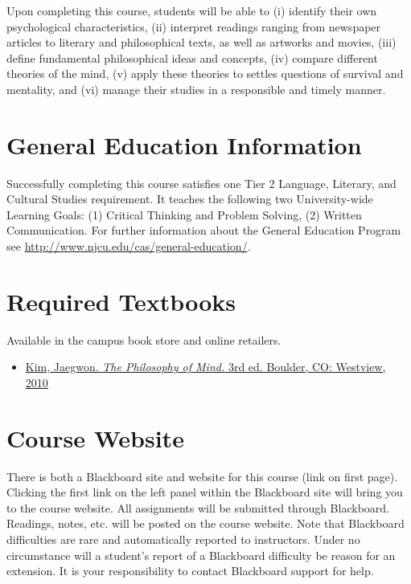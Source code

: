 \documentclass[article,oneside]{memoir}
\begin{document}
Upon completing this course, students will be able to  (i) identify their own psychological characteristics, (ii) interpret readings ranging from newspaper articles to literary and philosophical texts, as well as artworks and movies, (iii) define fundamental philosophical ideas and concepts, (iv) compare different theories of the mind, (v) apply these theories to settles questions of survival and mentality,  and  (vi) manage their studies in a responsible and timely manner. 


\section{General Education Information} 
Successfully completing this course satisfies one Tier 2 Language, Literary, and Cultural Studies requirement. It teaches the following two University-wide Learning Goals: (1) Critical Thinking and Problem Solving, (2) Written Communication. For further information about the General Education Program see \href{http://www.njcu.edu/cas/general-education/}{http://www.njcu.edu/cas/general-education/}.


\section{Required Textbooks}
Available in the campus book store and online retailers.


\begin{itemize}
\item \href{https://www.amazon.com/Philosophy-Mind-Jaegwon-Kim/dp/0813344581/ref=sr_1_1?ie=UTF8&qid=1484684648&sr=8-1&keywords=kim+philosophy+of+mind}{Kim, Jaegwon. \emph{The Philosophy of Mind.} 3rd ed. Boulder, CO: Westview, 2010} 
\end{itemize}


\section{Course Website}
There is both a Blackboard site and website for this course (link on first page). Clicking the first link on the left panel within the Blackboard site will bring you to the course website. All assignments will be submitted through Blackboard. Readings, notes, etc. will be posted on the course website. Note that Blackboard difficulties are rare and automatically reported to instructors. Under no circumstance will a student's report of a Blackboard difficulty be reason for an extension. It is your responsibility to contact Blackboard support for help.
\end{document}

